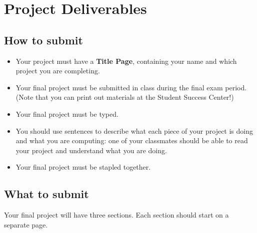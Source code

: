 \documentclass[12pt]{article}
\begin{document}

\section{Project Deliverables}

\subsection*{How to submit}
\begin{itemize}

\item Your project must have a {\bf Title Page},  containing your name and which project you are completing.

\item Your final project must be submitted in class during the final exam period. (Note that you can print out materials at the Student Success Center!)

\item Your final project must be typed.

\item You should use sentences to describe what each piece of your project is doing and what you are computing: one of your classmates should be able to read your project and understand what you are doing.

\item Your final project must be stapled together.
\end{itemize}

\subsection*{What to submit}

Your final project will have three sections. Each section should start on a separate page.
\end{document}
